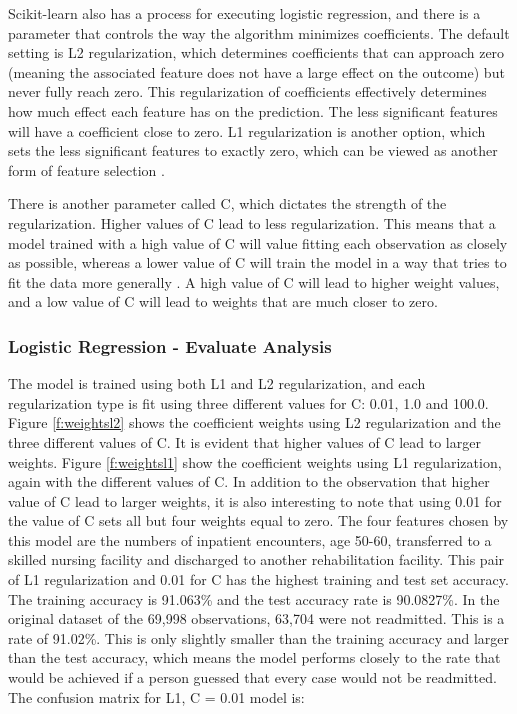 \documentclass[sigconf]{acmart}
\begin{document}
Scikit-learn also has a process for executing logistic regression, and there is a parameter that controls the way the algorithm minimizes coefficients. The default setting is L2 regularization, which determines coefficients that can approach zero (meaning the associated feature does not have a large effect on the outcome) but never fully reach zero. This regularization of coefficients effectively determines how much effect each feature has on the prediction. The less significant features will have a coefficient close to zero. L1 regularization is another option, which sets the less significant features to exactly zero, which can be viewed as another form of feature selection \cite{cite08}.

There is another parameter called C, which dictates the strength of the regularization. Higher values of C lead to less regularization. This means that a model trained with a high value of C will value fitting each observation as closely as possible, whereas a lower value of C will train the model in a way that tries to fit the data more generally \cite{cite08}. A high value of C will lead to higher weight values, and a low value of C will lead to weights that are much closer to zero.

\subsubsection{Logistic Regression - Evaluate Analysis}

The model is trained using both L1 and L2 regularization, and each regularization type is fit using three different values for C: 0.01, 1.0 and 100.0. Figure \ref{f:weightsl2} shows the coefficient weights using L2 regularization and the three different values of C. It is evident that higher values of C lead to larger weights. Figure \ref{f:weightsl1} show the coefficient weights using L1 regularization, again with the different values of C. In addition to the observation that higher value of C lead to larger weights, it is also interesting to note that using 0.01 for the value of C sets all but four weights equal to zero. The four features chosen by this model are the numbers of inpatient encounters, age 50-60, transferred to a skilled nursing facility and discharged to another rehabilitation facility. This pair of L1 regularization and 0.01 for C has the highest training and test set accuracy. The training accuracy is 91.063\% and the test accuracy rate is 90.0827\%. In the original dataset of the 69,998 observations, 63,704 were not readmitted. This is a rate of 91.02\%. This is only slightly smaller than the training accuracy and larger than the test accuracy, which means the model performs closely to the rate that would be achieved if a person guessed that every case would not be readmitted.
The confusion matrix for L1, C = 0.01 model is:
\end{document}
